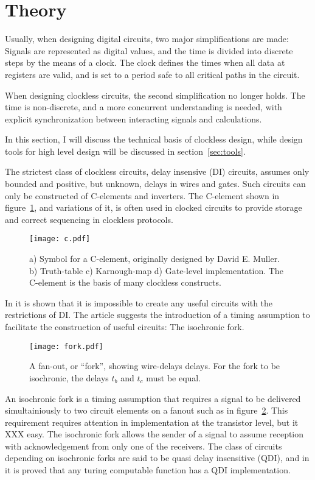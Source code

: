 \section{Theory}

Usually, when designing digital circuits, two major simplifications
are made: Signals are represented as digital values, and the time is
divided into discrete steps by the means of a clock. The clock defines
the times when all data at registers are valid, and is set to a
period safe to all critical paths in the circuit.

When designing clockless circuits, the second simplification no longer
holds. The time is non-discrete, and a more concurrent understanding
is needed, with explicit synchronization between interacting signals
and calculations.

In this section, I will discuss the technical basis of clockless
design, while design tools for high level design will be discussed in
section~\ref{sec:tools}.

The strictest class of clockless circuits, delay insensive (DI)
circuits, assumes only bounded and positive, but unknown, delays in
wires and gates. Such circuits can only be constructed of C-elements
and inverters. The C-element shown in figure~\ref{fig:c}, and
variations of it, is often used in clocked circuits to provide storage
and correct sequencing in clockless protocols.

\begin{figure}[htbp]
  \centering
  \texttt{[image: c.pdf]}
  \caption{a) Symbol for a C-element, originally designed by David
    E. Muller. b) Truth-table c) Karnough-map d) Gate-level
    implementation. The C-element is the basis of many clockless
    constructs.}
  \label{fig:c}
\end{figure}

In \cite{dilimit} it is shown that it is impossible to create any
useful circuits with the restrictions of DI. The article suggests the
introduction of a timing assumption to facilitate the construction of
useful circuits: The isochronic fork.

\begin{figure}[htbp]
  \centering
  \texttt{[image: fork.pdf]}
  \caption{A fan-out, or ``fork'', showing wire-delays delays. For the
    fork to be isochronic, the delays $t_b$ and $t_c$ must be equal.}
  \label{fig:fork}
\end{figure}

An isochronic fork is a timing assumption that requires a signal to be
delivered simultainiously to two circuit elements on a fanout such as
in figure~\ref{fig:fork}. This requirement requires attention in
implementation at the transistor level, but it XXX easy. The
isochronic fork allows the sender of a signal to assume reception with
acknowledgement from only one of the receivers. The class of circuits
depending on isochronic forks are said to be quasi delay insensitive
(QDI), and in \cite{turing} it is proved that any turing computable
function has a QDI implementation.

